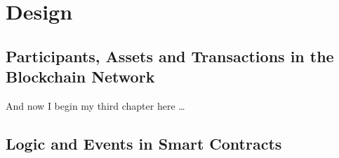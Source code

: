 \chapter{Design}

\section{Participants, Assets and Transactions in the Blockchain Network}
And now I begin my third chapter here \dots

\section{Logic and Events in Smart Contracts}